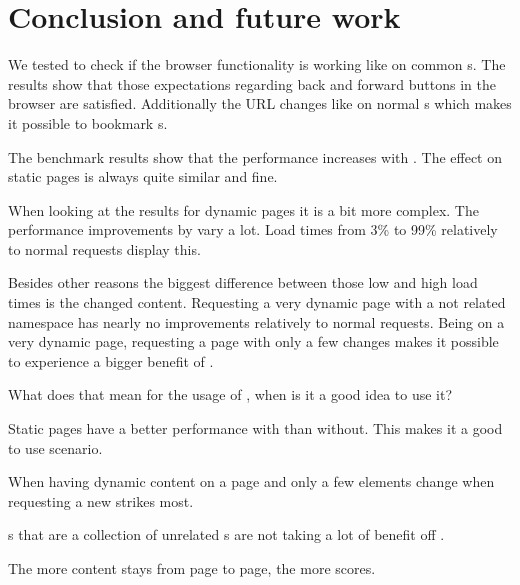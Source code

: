 \section{Conclusion and future work}

We tested \lare{} to check if the browser functionality is working like on common \webApplication{}s.
The results show that those expectations regarding back and forward buttons in the browser are satisfied.
Additionally the URL changes like on normal \webApplication{}s which makes it possible to bookmark \webPage{}s.

The benchmark results show that the performance increases with \lare{}.
The effect on static pages is always quite similar and fine.

When looking at the results for dynamic pages it is a bit more complex.
The performance improvements by \lare{} vary a lot.
Load times from 3\% to 99\% relatively to normal requests display this.

Besides other reasons the biggest difference between those low and high load times is the changed content.
Requesting a very dynamic page with a not related namespace has nearly no improvements relatively to normal requests.
Being on a very dynamic page, requesting a page with only a few changes makes it possible to experience a bigger benefit of \lare{}.

What does that mean for the usage of \lare{}, when is it a good idea to use it?

Static pages have a better performance with \lare{} than without.
This makes it a good to use scenario.

When having dynamic content on a page and only a few elements change when requesting a new \webPage{} \lare{} strikes most.

\webSite{}s that are a collection of unrelated \webPage{}s are not taking a lot of benefit off \lare{}.

The more content stays from page to page, the more \lare{} scores.
